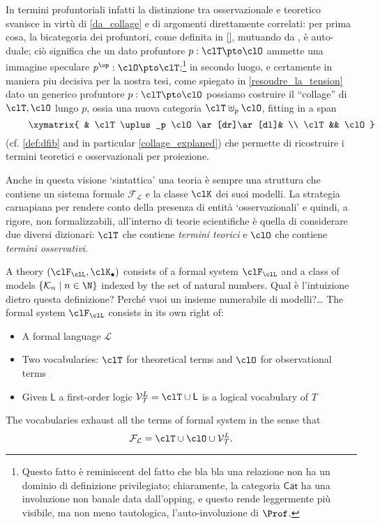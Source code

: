 In termini profuntoriali infatti la distinzione tra osservazionale e teoretico svanisce in virtù di \autoref{da_collage} e di argomenti direttamente correlati: per prima cosa, la bicategoria dei profuntori, come definita in \autoref{}, mutuando da \cite{benabou2000distributors}, è auto-duale; ciò significa che un dato profuntore $p : \clT \pto \clO$ ammette una immagine speculare $p^\op : \clO \pto \clT$;\footnote{Questo fatto è reminiscent del fatto che bla bla una relazione non ha un dominio di definizione privilegiato; chiaramente, la categoria $\mathsf{Cat}$ ha una involuzione non banale data dall'opping, e questo rende leggermente più visibile, ma non meno tautologica, l'auto-involuzione di $\Prof$.} in secondo luogo, e certamente in maniera piu decisiva per la nostra tesi, come spiegato in \autoref{resoudre_la_tension} dato un generico profuntore $p : \clT \pto\clO$ possiamo costruire il ``collage'' di $\clT,\clO$ lungo $p$, ossia una nuova categoria $\clT\uplus_p\clO$, fitting in a span 
\[ \vcenter{\xymatrix{
	& \clT\uplus_p \clO \ar[dr]\ar[dl]& \\ 
	\clT  && \clO 
}} \] (cf. \autoref{def:dfib} and in particular \autoref{collage_explaned}) che permette di ricostruire i termini teoretici e osservazionali per proiezione.
\begin{remark}\label{hint_at_collage}
	Anche in questa visione `sintattica' \cite{giunti2016} una teoria è sempre una struttura che contiene un sistema formale $\mathcal{F_L}$ e la classe $\clK$ dei suoi modelli. La strategia carnapiana per rendere conto della presenza di entità `osservazionali' e quindi, a rigore, non formalizzabili, all'interno di teorie scientifiche è quella di considerare due diversi dizionari: $\clT$ che contiene \emph{termini teorici} e $\clO$ che contiene \emph{termini osservativi}. 
\end{remark}


\begin{definition}
	A theory $(\clF_\clL, \clK_\bullet)$ consists of a formal system $\clF_\clL$ and a class of models $\{\mathcal{K}_n \mid n \in \N \}$ indexed by the set of natural numbers. 
	{\color{red} Qual è l'intuizione dietro questa definizione? Perché vuoi un insieme numerabile di modelli?\dots}
	The formal system $\clF_\clL$ consists in its own right of:
	\begin{itemize}
		\item A formal language $\mathcal{L}$ 
		\item Two vocabularies: $\clT$ for theoretical terms and $\clO$ for observational terms 
		\item Given $\mathsf{L}$ a first-order logic $\mathcal{V}_{\mathcal{T}}^L = \clT \cup \mathsf{L}$ is a logical vocabulary of $T$
	\end{itemize}    
\end{definition}
The vocabularies exhaust all the terms of formal system in the sense that 
\[\mathcal{F_L} = \clT \cup \clO \cup \mathcal{V}_{\mathcal{T}}^L.\]

